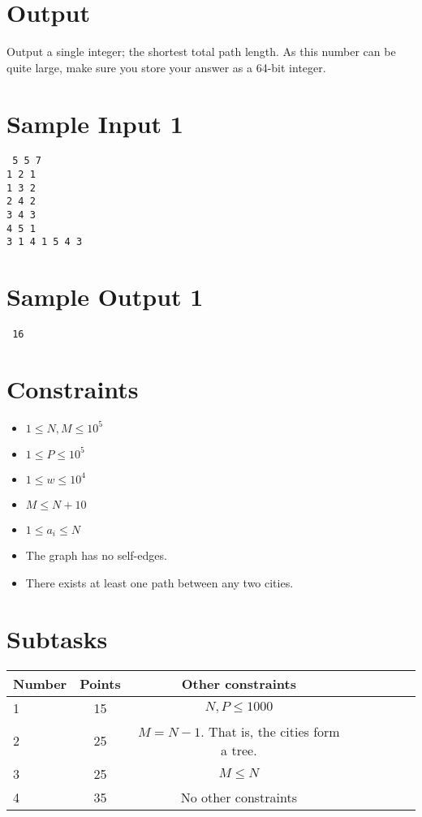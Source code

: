 \documentclass{article}
\begin{document}
\section*{Output}

Output a single integer; the shortest total path length. As this number can be quite large, make sure you store your answer as a 64-bit integer.

\begin{multicols}{2}
\section*{Sample Input 1}
{\tt
5 5 7\\
1 2 1\\
1 3 2\\
2 4 2\\
3 4 3\\
4 5 1\\
3 1 4 1 5 4 3
}
\columnbreak
\section*{Sample Output 1}
{\tt
16
}
\end{multicols}

\newpage
\section*{Constraints}
\begin{itemize}
\item $1\leq N, M \leq 10^5$
\item $1 \le P \le 10^5$
\item $1 \le w \le 10^4$
\item $M \le N + 10$
\item $1 \le a_i \le N$
\item The graph has no self-edges.
\item There exists at least one path between any two cities.
\end{itemize}

\section*{Subtasks}
\begin{tabular}{l*{6}{c}r}
Number & Points & Other constraints\\
\hline
1 & 15 & $N, P \le 1000$ \\
2 & 25 & $M = N - 1$. That is, the cities form a tree.\\
3 & 25 & $M \le N$ \\
4 & 35 & No other constraints
\end{tabular}
\end{document}
